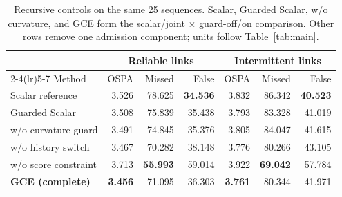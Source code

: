 \begin{table}[t]
\centering\small
\caption{Recursive controls on the same 25 sequences. Scalar, Guarded Scalar, w/o curvature, and GCE form the scalar/joint $\times$ guard-off/on comparison. Other rows remove one admission component; units follow Table~\ref{tab:main}.}
\label{tab:ablation}
\setlength{\tabcolsep}{6pt}
\begin{tabular*}{\textwidth}{@{\extracolsep{\fill}}lrrrrrr@{}}
\toprule
& \multicolumn{3}{c}{Reliable links} & \multicolumn{3}{c}{Intermittent links} \\
\cmidrule(lr){2-4}\cmidrule(lr){5-7}
Method & OSPA & Missed & False & OSPA & Missed & False \\
\midrule
Scalar reference & 3.526 & 78.625 & \textbf{34.536} & 3.832 & 86.342 & \textbf{40.523} \\
Guarded Scalar & 3.508 & 75.839 & 35.438 & 3.793 & 83.328 & 41.019 \\
w/o curvature guard & 3.491 & 74.845 & 35.376 & 3.805 & 84.047 & 41.615 \\
\midrule
w/o history switch & 3.467 & 70.282 & 38.148 & 3.776 & 80.266 & 43.105 \\
w/o score constraint & 3.713 & \textbf{55.993} & 59.014 & 3.922 & \textbf{69.042} & 57.784 \\
\midrule
\textbf{GCE (complete)} & \textbf{3.456} & 71.095 & 36.303 & \textbf{3.761} & 80.344 & 41.971 \\
\bottomrule
\end{tabular*}
\end{table}
